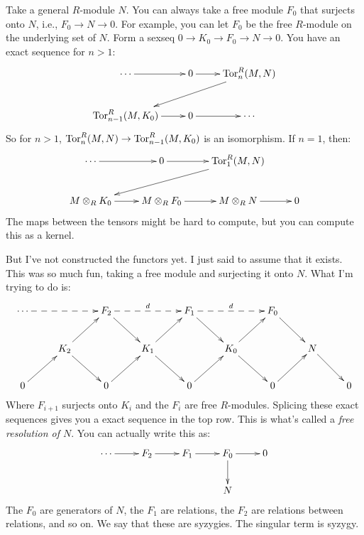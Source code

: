 Take a general $R$-module $N$. You can always take a free module $F_0$ that surjects onto $N$, i.e., $F_0\to N\to 0$. For example, you can let $F_0$ be the free $R$-module on the underlying set of $N$. Form a sexseq $0\to K_0\to F_0\to N\to 0$. You have an exact sequence for $n>1$:
\begin{equation*}
\xymatrix{\cdots\ar[r] & 0\ar[r] & \Tor^R_n(M,N)\ar[dll]\\
\Tor^R_{n-1}(M,K_0)\ar[r] & 0\ar[r] & \cdots}
\end{equation*}
So for $n>1$, $\operatorname{Tor}^R_n(M,N)\to \operatorname{Tor}^R_{n-1}(M,K_0)$ is an isomorphism. If $n=1$, then:
\begin{equation*}
\xymatrix{\cdots\ar[r] & 0\ar[r] & \Tor^R_1(M,N)\ar[dll]\\
M\otimes_R K_0\ar[r] & M\otimes_R F_0\ar[r] & M\otimes_R N\ar[r] & 0}
\end{equation*}
The maps between the tensors might be hard to compute, but you can compute this as a kernel.

But I've not constructed the functors yet. I just said to assume that it exists. This was so much fun, taking a free module and surjecting it onto $N$. What I'm trying to do is:
\begin{equation*}
\xymatrix{\cdots\ar@{-->}[rr] & & F_2\ar[dr]\ar@{-->}[rr]^d & & F_1\ar[dr]\ar@{-->}[rr]^d & & F_0\ar[dr]\\
& K_2\ar[ur]\ar[dr] & & K_1\ar[ur]\ar[dr] & & K_0\ar[ur]\ar[dr] & & N\ar[dr]\\
0\ar[ur] & & 0\ar[ur] & & 0\ar[ur] & & 0\ar[ur] & & 0}
\end{equation*}
Where $F_{i+1}$ surjects onto $K_i$ and the $F_i$ are free $R$-modules. Splicing these exact sequences gives you a exact sequence in the top row. This is what's called a \emph{free resolution of $N$}. You can actually write this as:
\begin{equation*}
\xymatrix{\cdots\ar[r] & F_2\ar[r] & F_1\ar[r] & F_0\ar[r]\ar[d] & 0\\
 & & & N & }
\end{equation*}
The $F_0$ are generators of $N$, the $F_1$ are relations, the $F_2$ are relations between relations, and so on. We say that these are syzygies. The singular term is syzygy.

